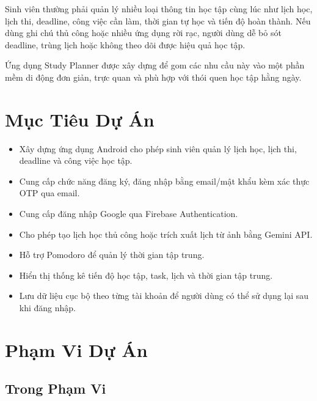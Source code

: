 \documentclass[12pt,a4paper]{report}
\begin{document}
Sinh viên thường phải quản lý nhiều loại thông tin học tập cùng lúc như lịch học, lịch thi, deadline, công việc cần làm, thời gian tự học và tiến độ hoàn thành. Nếu dùng ghi chú thủ công hoặc nhiều ứng dụng rời rạc, người dùng dễ bỏ sót deadline, trùng lịch hoặc không theo dõi được hiệu quả học tập.

Ứng dụng Study Planner được xây dựng để gom các nhu cầu này vào một phần mềm di động đơn giản, trực quan và phù hợp với thói quen học tập hằng ngày.

\section{Mục Tiêu Dự Án}

\begin{itemize}
\item Xây dựng ứng dụng Android cho phép sinh viên quản lý lịch học, lịch thi, deadline và công việc học tập.
\item Cung cấp chức năng đăng ký, đăng nhập bằng email/mật khẩu kèm xác thực OTP qua email.
\item Cung cấp đăng nhập Google qua Firebase Authentication.
\item Cho phép tạo lịch học thủ công hoặc trích xuất lịch từ ảnh bằng Gemini API.
\item Hỗ trợ Pomodoro để quản lý thời gian tập trung.
\item Hiển thị thống kê tiến độ học tập, task, lịch và thời gian tập trung.
\item Lưu dữ liệu cục bộ theo từng tài khoản để người dùng có thể sử dụng lại sau khi đăng nhập.
\end{itemize}

\section{Phạm Vi Dự Án}

\subsection{Trong Phạm Vi}
\end{document}

